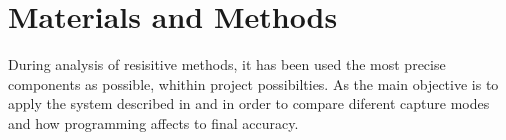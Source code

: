 \section{Materials and Methods}
During analysis of resisitive methods, it has been used the most precise
components as possible, whithin project possibilties. As the main objective is
to apply the system described in \cite{UncertaintyInResistance} and
\cite{AccuracyAndResolution} in order to compare diferent capture modes and how
programming affects to final accuracy.



